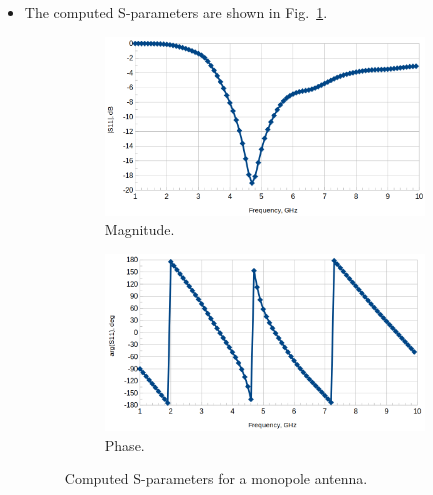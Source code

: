 \documentclass[titlepage]{article}
\renewcommand\_{\textunderscore\linebreak[1]}
\begin{document}
\begin{itemize}
\item The computed S-parameters are shown in Fig.~\ref{fig:monopole_S}.
\begin{figure}[H]
  \centering
  \begin{subfigure}{0.5\textwidth}
     \includegraphics[width=\linewidth]{../tutorials/OpenParEM3D/monopole_antenna/screenshots/monopole_mag}
     \caption{Magnitude.}
  \end{subfigure}
  \par\bigskip
  \begin{subfigure}{0.5\textwidth}
     \includegraphics[width=\linewidth]{../tutorials/OpenParEM3D/monopole_antenna/screenshots/monopole_phase}
     \caption{Phase.}
  \end{subfigure}
  \caption{Computed S-parameters for a monopole antenna.}
  \label{fig:monopole_S}
\end{figure}


\end{itemize}
\end{document}
